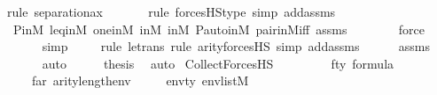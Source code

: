 \begin{isabellebody}
{\isacharparenleft}{\kern0pt}rule\ separation{\isacharunderscore}{\kern0pt}ax{\isacharparenright}{\kern0pt}\isanewline
\ \ \ \ \ \ \isamarkupfalse%
{\isacharparenleft}{\kern0pt}rule\ forcesHS{\isacharunderscore}{\kern0pt}type{\isacharcomma}{\kern0pt}\ simp\ add{\isacharcolon}{\kern0pt}assms{\isacharparenright}{\kern0pt}\isanewline
\ \ \ \ \isamarkupfalse%
\ P{\isacharunderscore}{\kern0pt}in{\isacharunderscore}{\kern0pt}M\ leq{\isacharunderscore}{\kern0pt}in{\isacharunderscore}{\kern0pt}M\ one{\isacharunderscore}{\kern0pt}in{\isacharunderscore}{\kern0pt}M\ {\isasymF}{\isacharunderscore}{\kern0pt}in{\isacharunderscore}{\kern0pt}M\ {\isasymG}{\isacharunderscore}{\kern0pt}in{\isacharunderscore}{\kern0pt}M\ P{\isacharunderscore}{\kern0pt}auto{\isacharunderscore}{\kern0pt}in{\isacharunderscore}{\kern0pt}M\ pair{\isacharunderscore}{\kern0pt}in{\isacharunderscore}{\kern0pt}M{\isacharunderscore}{\kern0pt}iff\ assms\ \isanewline
\ \ \ \ \ \isamarkupfalse%
\ force\ \isanewline
\ \ \ \ \isamarkupfalse%
\ simp\isanewline
\ \ \ \ \isamarkupfalse%
{\isacharparenleft}{\kern0pt}rule\ le{\isacharunderscore}{\kern0pt}trans{\isacharcomma}{\kern0pt}\ rule\ arity{\isacharunderscore}{\kern0pt}forcesHS{\isacharcomma}{\kern0pt}\ simp\ add{\isacharcolon}{\kern0pt}assms{\isacharparenright}{\kern0pt}\isanewline
\ \ \ \ \isamarkupfalse%
\ assms\ \isanewline
\ \ \ \ \isamarkupfalse%
\ auto\isanewline
\ \ \isamarkupfalse%
\ \isamarkupfalse%
\ {\isacharquery}{\kern0pt}thesis\ \isamarkupfalse%
\ auto\isanewline
{}\isamarkupfalse%
%
\endisatagproof
{\isafoldproof}%
%
\isadelimproof
\isanewline
%
\endisadelimproof
\isanewline
{}\isamarkupfalse%
\ Collect{\isacharunderscore}{\kern0pt}ForcesHS\ {\isacharcolon}{\kern0pt}\isanewline
\ \ \ \isanewline
\ \ \ \ fty{\isacharcolon}{\kern0pt}\ {\isachardoublequoteopen}{\isasymphi}{\isasymin}formula{\isachardoublequoteclose}\ \isanewline
\ \ \ \ far{\isacharcolon}{\kern0pt}\ {\isachardoublequoteopen}arity{\isacharparenleft}{\kern0pt}{\isasymphi}{\isacharparenright}{\kern0pt}{\isasymle}length{\isacharparenleft}{\kern0pt}env{\isacharparenright}{\kern0pt}{\isachardoublequoteclose}\ \isanewline
\ \ \ \ envty{\isacharcolon}{\kern0pt}\ {\isachardoublequoteopen}env{\isasymin}list{\isacharparenleft}{\kern0pt}M{\isacharparenright}{\kern0pt}{\isachardoublequoteclose}\isanewline
\ \ \isanewline

\end{isabellebody}
